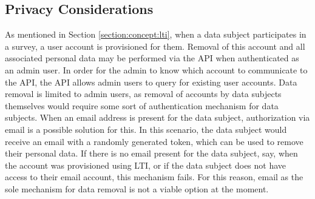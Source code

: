 \subsection{Privacy Considerations}
    As mentioned in Section \ref{section:concept:lti}, when a data subject participates
    in a survey, a user account is provisioned for them. Removal
    of this account and all associated personal data may be performed
    via the API when authenticated as an admin user.
    In order for the admin to know which account to communicate
    to the API, the API allows admin users to query for existing
    user accounts. Data removal is limited to admin users,
    as removal of accounts by data subjects themselves would require
    some sort of authentication mechanism for data subjects.
    When an email address is present for the data subject,
    authorization via email is a possible solution for this.
    In this scenario, the data subject would receive an email
    with a randomly generated token, which can be used to remove their personal
    data. If there is no email present for the data subject, say,
    when the account was provisioned using LTI, or if the data subject
    does not have access to their email account, this mechanism fails.
    For this reason, email as the sole mechanism for data removal is not a viable
    option at the moment.
    